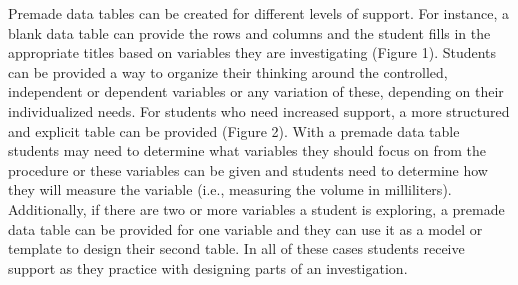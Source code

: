 \documentclass[11pt]{sig-alternate}
\begin{document}
\begin{large}
Premade data tables can be created for different levels of support. For instance, a blank data table can provide the rows and columns and the student fills in the appropriate titles based on variables they are investigating (Figure 1). Students can be provided a way to organize their thinking around the controlled, independent or dependent variables or any variation of these, depending on their individualized needs. For students who need increased support, a more structured and explicit table can be provided (Figure 2). With a premade data table students may need to determine what variables they should focus on from the procedure or these variables can be given and students need to determine how they will measure the variable (i.e., measuring the volume in milliliters). Additionally, if there are two or more variables a student is exploring, a premade data table can be provided for one variable and they can use it as a model or template to design their second table. In all of these cases students receive support as they practice with designing parts of an investigation. 

\begin{table}[h]
\captionsetup{font=large}
\caption*{\textit{Figure 1. Example of Data Table That Provides Organization Around the Dependent Variable (Time)}}
\label{tab:table-1}
\end{table}


\end{large}
\end{document}
